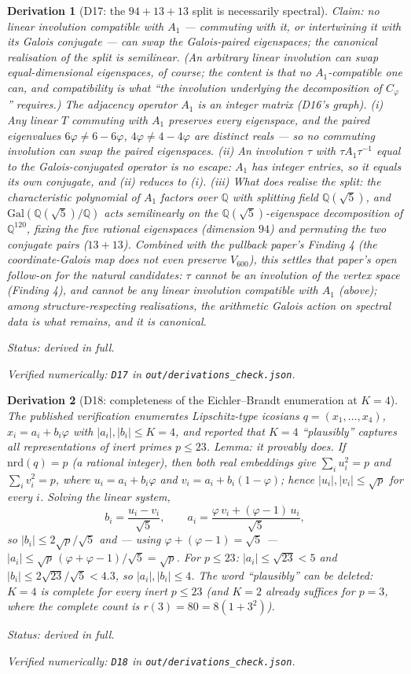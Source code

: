 \documentclass[11pt]{article}
\newtheorem{deriv}{Derivation}
\theoremstyle{remark}
\newcommand{\bucket}[1]{\par\smallskip\noindent\textit{Status: #1.}}
\newcommand{\chk}[1]{\par\noindent\textit{Verified numerically:
\texttt{#1} in \texttt{out/derivations\_check.json}.}}
\begin{document}
\begin{deriv}[D17: the $94+13+13$ split is necessarily
spectral]\label{d17}
\emph{Claim: no linear involution compatible with $A_1$ --- commuting
with it, or intertwining it with its Galois conjugate --- can swap the
Galois-paired eigenspaces; the canonical realisation of the split is
semilinear.} (An arbitrary linear involution \emph{can} swap
equal-dimensional eigenspaces, of course; the content is that no
$A_1$-compatible one can, and compatibility is what ``the involution
underlying the decomposition of $C_\varphi$'' requires.)
The adjacency operator $A_1$ is an integer matrix (D16's graph). (i)
Any linear $T$ commuting with $A_1$ preserves every eigenspace, and
the paired eigenvalues $6\varphi \ne 6 - 6\varphi$,
$4\varphi \ne 4 - 4\varphi$ are distinct reals --- so no commuting
involution can swap the paired eigenspaces. (ii) An involution
$\tau$ with $\tau A_1 \tau^{-1}$ equal to the Galois-conjugated
operator is no escape: $A_1$ has integer entries, so it equals its own
conjugate, and (ii) reduces to (i). (iii) What does realise the split:
the characteristic polynomial of $A_1$ factors over $\mathbb{Q}$ with
splitting field $\mathbb{Q}(\sqrt5)$, and
$\mathrm{Gal}(\mathbb{Q}(\sqrt5)/\mathbb{Q})$ acts semilinearly on the
$\mathbb{Q}(\sqrt5)$-eigenspace decomposition of $\mathbb{Q}^{120}$,
fixing the five rational eigenspaces (dimension $94$) and permuting
the two conjugate pairs ($13 + 13$). Combined with the pullback
paper's Finding 4 (the coordinate-Galois map does not even preserve
$V_{600}$), this settles that paper's open follow-on for the natural candidates:
$\tau$ cannot be an involution of the vertex space (Finding 4), and
cannot be any linear involution compatible with $A_1$ (above); among
structure-respecting realisations, the arithmetic Galois action on
spectral data is what remains, and it is canonical.
\bucket{derived in full}\chk{D17}
\end{deriv}

\begin{deriv}[D18: completeness of the Eichler--Brandt enumeration at
$K = 4$]\label{d18}
The published verification enumerates Lipschitz-type icosians
$q = (x_1, \dots, x_4)$, $x_i = a_i + b_i\varphi$ with
$|a_i|, |b_i| \le K = 4$, and reported that $K = 4$ ``plausibly''
captures all representations of inert primes $p \le 23$. Lemma: it
provably does. If $\mathrm{nrd}(q) = p$ (a rational integer), then
both real embeddings give $\sum_i u_i^2 = p$ and $\sum_i v_i^2 = p$,
where $u_i = a_i + b_i\varphi$ and $v_i = a_i + b_i(1-\varphi)$; hence
$|u_i|, |v_i| \le \sqrt p$ for every $i$. Solving the linear system,
\[
b_i = \frac{u_i - v_i}{\sqrt5},
\qquad
a_i = \frac{\varphi\,v_i + (\varphi - 1)\,u_i}{\sqrt5},
\]
so $|b_i| \le 2\sqrt p/\sqrt5$ and --- using
$\varphi + (\varphi - 1) = \sqrt5$ ---
$|a_i| \le \sqrt p\,(\varphi + \varphi - 1)/\sqrt5 = \sqrt p$. For
$p \le 23$: $|a_i| \le \sqrt{23} < 5$ and
$|b_i| \le 2\sqrt{23}/\sqrt5 < 4.3$, so $|a_i|, |b_i| \le 4$. The word
``plausibly'' can be deleted: $K = 4$ is complete for every inert
$p \le 23$ (and $K = 2$ already suffices for $p = 3$, where the
complete count is $r(3) = 80 = 8(1 + 3^2)$).
\bucket{derived in full}\chk{D18}
\end{deriv}
\end{document}
